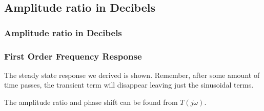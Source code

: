 \documentclass[fleqn]{beamer} %
\newcommand{\sectionIIsubsectionIItitle}{Amplitude ratio in Decibels}
\begin{document}
		\subsection{\sectionIIsubsectionIItitle}\label{sectionIIsubsectionII}

			\begin{frame}

				\frametitle{\sectionIIsubsectionIItitle}
				\bigskip

				\frametitle{First Order Frequency Response}

				\small

				The steady state response we derived is shown. Remember, after some amount of time passes, the transient term will disappear leaving just the sinusoidal terms. \vspc
				\begin{framed}
				\vspcc

				The amplitude ratio and phase shift can be found from $T(j\omega)$. \vspcc

				\vspc

				\vspc
				\end{framed}

				\btVFill 
			\end{frame}
\end{document}
